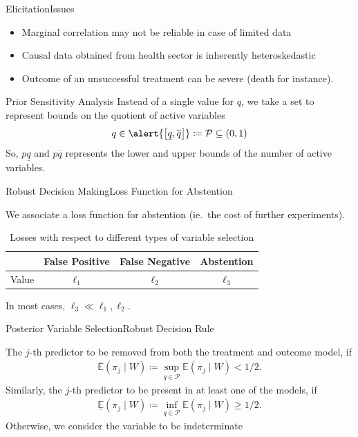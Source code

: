 \documentclass[aspectratio=169]{beamer}					%
\begin{document}
\begin{frame}{Elicitation}{Issues}
\begin{itemize}
    \item Marginal correlation may not be reliable in case of
    \alert{limited data}
    \item Causal data obtained from health sector is inherently \alert{heteroskedastic}
    \item Outcome of an unsuccessful treatment can be \alert{severe (death for instance)}.
\end{itemize}    
\end{frame}

\begin{frame}{Prior Sensitivity Analysis}
    Instead of a single value for $q$, we take a \alert{set} to
    represent \alert{bounds on the quotient of active variables} 
    \begin{equation}
        q \in \alert{\left[\underline{q}, \overline{q}\right]}\coloneqq
        \mathcal{P}\subseteq (0,1)
    \end{equation}
    So, \alert{$p\underline{q}$} and \alert{$p\overline{q}$} represents the
    lower and upper bounds of the number of active variables.

\end{frame}

\begin{frame}{Robust Decision Making}{Loss Function for Abstention}
    
We associate \alert{a loss function for abstention} (ie.~the cost of further experiments). 
\begin{table}[h]
    \caption{Losses with respect to different types of variable selection}
    \label{tab:loss:vs}
    \centering
    \begin{tabular}{l|ccc}
       &  False Positive & False Negative & Abstention \\
       \hline
       Value  &  $\ell_1$ & $\ell_2$ & $\ell_3$
    \end{tabular}
\end{table}
In most cases, $\ell_3\ll \ell_1,\ell_2$. 

\end{frame}

\iffalse
\begin{frame}{Posterior Variable Selection}{Robust Decision Rule}

The $j$-th predictor to be removed from \alert{both} the
treatment and outcome model, if
\begin{align}
	\overline{\mathbb{E}} (\pi_j\mid W)\coloneqq \sup_{q\in \mathcal{P}} \mathbb{E}(\pi_j\mid W) < 1/2.
\end{align}
Similarly, the $j$-th predictor to be present in at least one of the models, if
\begin{align}\label{eq:vs:sel}
	\underline{\mathbb{E}} (\pi_j\mid W)\coloneqq \inf_{q\in \mathcal{P}} \mathbb{E}(\pi_j\mid W) \ge 1/2.
\end{align}
Otherwise, we consider the variable to be \alert{indeterminate}

\end{frame}
\end{document}
